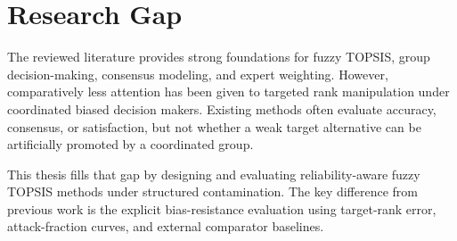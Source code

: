 \section{Research Gap}

The reviewed literature provides strong foundations for fuzzy TOPSIS, group decision-making, consensus modeling, and expert weighting. However, comparatively less attention has been given to targeted rank manipulation under coordinated biased decision makers. Existing methods often evaluate accuracy, consensus, or satisfaction, but not whether a weak target alternative can be artificially promoted by a coordinated group.

This thesis fills that gap by designing and evaluating reliability-aware fuzzy TOPSIS methods under structured contamination. The key difference from previous work is the explicit bias-resistance evaluation using target-rank error, attack-fraction curves, and external comparator baselines.
